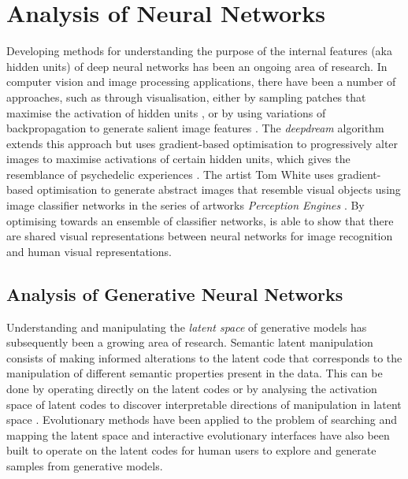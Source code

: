 \section{Analysis of Neural Networks} 

Developing methods for understanding the purpose of the internal features (aka hidden units) of deep neural networks has been an ongoing area of research. 
In computer vision and image processing applications, there have been a number of approaches, such as through visualisation, either by sampling patches that maximise the activation of hidden units \citep{zeiler2014visualizing, zhou2014object}, or by using variations of backpropagation to generate salient image features \citep{zeiler2014visualizing, simonyan2013deep}. 
The \textit{deepdream} algorithm \citep{mordvintsev2015inceptionism} extends this approach but uses gradient-based optimisation to progressively alter images to maximise activations of certain hidden units, which gives the resemblance of psychedelic experiences \citep{suzuki2017deep}.
The artist Tom White uses gradient-based optimisation to generate abstract images that resemble visual objects using image classifier networks in the series of artworks \textit{Perception Engines} \citep{white2018perception}.
By optimising towards an ensemble of classifier networks, \cite{white2019shared} is able to show that there are shared visual representations between neural networks for image recognition and human visual representations.

\subsection{Analysis of Generative Neural Networks}

Understanding and manipulating the \emph{latent space} of generative models has subsequently been a growing area of research. 
Semantic latent manipulation consists of making informed alterations to the latent code that corresponds to the manipulation of different semantic properties present in the data. 
This can be done by operating directly on the latent codes \citep{brock2016neural, shen2020interpreting} or by analysing the activation space of latent codes to discover interpretable directions of manipulation in latent space \citep{harkonen2020ganspace}. 
Evolutionary methods have been applied to the problem of searching and mapping the latent space \citep{bontrager2018deepmasterprints, fernandes2020evolutionary} and interactive evolutionary interfaces have also been built to operate on the latent codes \citep{Simon-ganbreeder} for human users to explore and generate samples from generative models. 

